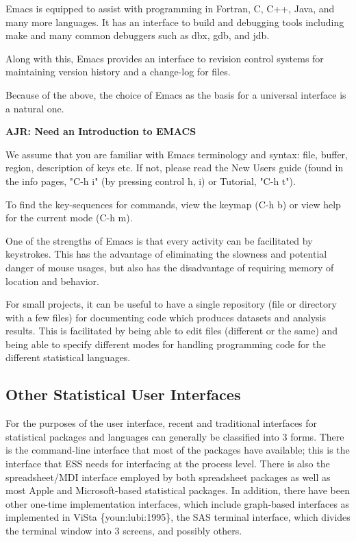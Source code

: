 \documentclass{article}
\newcommand{\citep}[1]{{\{\sf#1\}}}
\begin{document}
Emacs is equipped to assist with programming in Fortran, C, C++, Java,
and many more languages.  It has an interface to build and debugging
tools including make and many common debuggers such as dbx, gdb, and
jdb. 

Along with this, Emacs provides an interface to revision control
systems for maintaining version history and a change-log for files.

Because of the above, the choice of Emacs as the basis for a universal
interface is a natural one.  

\textbf{AJR: Need an Introduction to EMACS}

We assume that you are familiar with Emacs terminology and syntax:
file, buffer, region, description of keys etc.  If not, please read
the New Users guide (found in the info pages, "C-h i" (by pressing
control h, i) or Tutorial, "C-h t").

To find the key-sequences for commands, view the keymap (C-h b) or
view help for the current mode (C-h m).  

One of the strengths of Emacs is that every activity can be
facilitated by keystrokes.  This has the advantage of eliminating the
slowness and potential danger of mouse usages, but also has the
disadvantage of requiring memory of location and behavior.


For small projects, it can be useful to have a single repository (file
or directory with a few files) for documenting code which produces
datasets and analysis results.  This is facilitated by being able to
edit files (different or the same) and being able to specify different
modes for handling programming code for the different statistical
languages.

\subsection{Other Statistical User Interfaces}
\label{sec:intro:UI}

For the purposes of the user interface, recent and traditional
interfaces for statistical packages and languages can generally be
classified into 3 forms.  There is the command-line interface that
most of the packages have available; this is the interface that ESS
needs for interfacing at the process level.  There is also the
spreadsheet/MDI interface employed by both spreadsheet packages as
well as most Apple and Microsoft-based statistical packages.  In
addition, there have been other one-time implementation interfaces,
which include graph-based interfaces as implemented in ViSta
\citep{youn:lubi:1995}, the SAS terminal interface, which divides the
terminal window into 3 screens, and possibly others.
\end{document}
